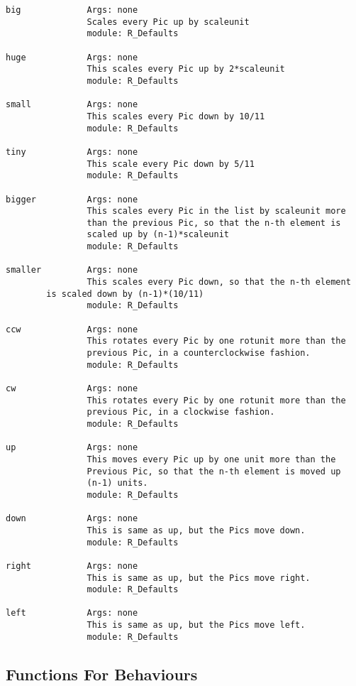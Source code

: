 \begin{verbatim}
big             Args: none
                Scales every Pic up by scaleunit
                module: R_Defaults

huge            Args: none
                This scales every Pic up by 2*scaleunit
                module: R_Defaults

small           Args: none
                This scales every Pic down by 10/11
                module: R_Defaults

tiny            Args: none
                This scale every Pic down by 5/11
                module: R_Defaults

bigger          Args: none
                This scales every Pic in the list by scaleunit more 
                than the previous Pic, so that the n-th element is
                scaled up by (n-1)*scaleunit 
                module: R_Defaults

smaller         Args: none
                This scales every Pic down, so that the n-th element
		is scaled down by (n-1)*(10/11)
                module: R_Defaults

ccw             Args: none
                This rotates every Pic by one rotunit more than the
                previous Pic, in a counterclockwise fashion.
                module: R_Defaults

cw              Args: none
                This rotates every Pic by one rotunit more than the
                previous Pic, in a clockwise fashion.
                module: R_Defaults

up              Args: none
                This moves every Pic up by one unit more than the 
                Previous Pic, so that the n-th element is moved up 
                (n-1) units.
                module: R_Defaults

down            Args: none
                This is same as up, but the Pics move down.
                module: R_Defaults

right           Args: none
                This is same as up, but the Pics move right.
                module: R_Defaults

left            Args: none
                This is same as up, but the Pics move left.
                module: R_Defaults
\end{verbatim}

\subsection{Functions For Behaviours}


